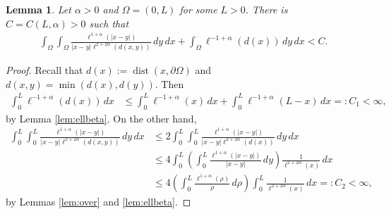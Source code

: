 \documentclass[11 pt]{article}
\newtheorem{lemma}[theorem]{Lemma}
\numberwithin{equation}{section}
\def\dist{\operatorname{dist}}
\begin{document}
\begin{lemma}\label{lem:int:bds}
Let $\alpha>0$ and $\Omega=(0,L)$ for some $L>0$. There is $C=C(L,\alpha)>0$ such that 
\begin{align*}
\int_{\Omega}\int_{\Omega}\frac{\ell^{1+\alpha}(|x-y|)}{|x-y|\ell^{2+2\alpha}(d(x,y))}\,dy\, dx+ \int_{\Omega}\ell^{-1+\alpha}(d(x))\, dy\,dx<C.
\end{align*}
\end{lemma}
\begin{proof}
Recall that $d(x):=\dist(x,\partial \Omega)$ and $d(x,y)=\min(d(x),d(y)).$ Then
\begin{align*}
\int_0^L \ell^{-1+\alpha}(d(x))\,dx&\leq \int_0^L \ell^{-1+\alpha}(x)\,dx+\int_0^L \ell^{-1+\alpha}(L-x)\,dx=:C_1<\infty,
\end{align*}
by Lemma \ref{lem:ellbeta}. On the other hand,
\begin{align*}
\int_0^L\int_0^L\frac{\ell^{1+\alpha}(|x-y|)}{|x-y|\ell^{2+2\alpha}(d(x,y))}\,dy\, dx
&\leq 2\int_0^L\int_0^L\frac{\ell^{1+\alpha}(|x-y|)}{|x-y|\ell^{2+2\alpha}(d(x))}\,dy\, dx\\
&\leq 4\int_0^L\left(\int_0^L\frac{\ell^{1+\alpha}(|x-y|)}{|x-y|}\,dy\right)\frac{1}{\ell^{2+2\alpha}(x)}\, dx\\
&\leq 4\left(\int_0^L\frac{\ell^{1+\alpha}(\rho)}{\rho}\,d\rho\right)\int_0^L\frac{1}{\ell^{2+2\alpha}(x)}\, dx=:C_2<\infty,
\end{align*}
by Lemmas \ref{lem:over} and \ref{lem:ellbeta}.
\end{proof}
\end{document}
